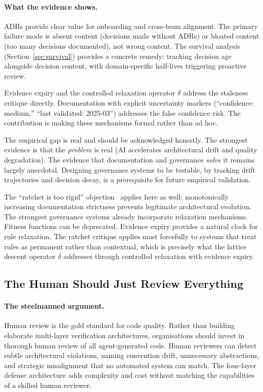 \paragraph{What the evidence shows.}
ADRs provide clear value for onboarding and cross-team alignment. The primary failure mode is absent content (decisions made without ADRs) or bloated content (too many decisions documented), not wrong content. The survival analysis (Section~\ref{sec:survival}) provides a concrete remedy: tracking decision age alongside decision content, with domain-specific half-lives triggering proactive review.

Evidence expiry and the controlled relaxation operator $\delta$ address the staleness critique directly. Documentation with explicit uncertainty markers (``confidence: medium,'' ``last validated: 2025-03'') addresses the false confidence risk. The contribution is making these mechanisms formal rather than ad hoc.

The empirical gap is real and should be acknowledged honestly. The strongest evidence is that the \emph{problem} is real (AI accelerates architectural drift and quality degradation). The evidence that documentation and governance \emph{solve} it remains largely anecdotal. Designing governance systems to be testable, by tracking drift trajectories and decision decay, is a prerequisite for future empirical validation.

The ``ratchet is too rigid'' objection~\citep{ford2017} applies here as well: monotonically increasing documentation strictness prevents legitimate architectural evolution. The strongest governance systems already incorporate relaxation mechanisms. Fitness functions can be deprecated. Evidence expiry provides a natural clock for rule relaxation. The ratchet critique applies most forcefully to systems that treat rules as permanent rather than contextual, which is precisely what the lattice descent operator $\delta$ addresses through controlled relaxation with evidence expiry.


\subsection{The Human Should Just Review Everything}
\label{sec:contrarian-human}

\paragraph{The steelmanned argument.}
Human review is the gold standard for code quality. Rather than building elaborate multi-layer verification architectures, organisations should invest in thorough human review of all agent-generated code. Human reviewers can detect subtle architectural violations, naming convention drift, unnecessary abstractions, and strategic misalignment that no automated system can match. The four-layer defense architecture adds complexity and cost without matching the capabilities of a skilled human reviewer.

